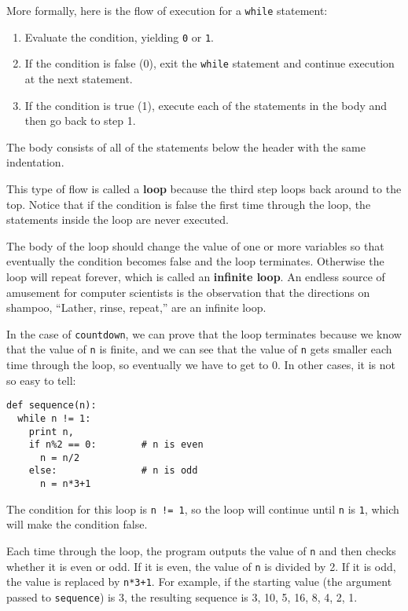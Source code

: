 More formally, here is the flow of execution for a {\tt while} statement:

\begin{enumerate}

\item Evaluate the condition, yielding {\tt 0} or {\tt 1}.

\item If the condition is false (0), exit the {\tt while} statement
and continue execution at the next statement.

\item If the condition is true (1), execute each of the statements in the
body and then go back to step 1.

\end{enumerate}

The body consists of all of the statements below the header
with the same indentation.

This type of flow is called a {\bf loop} because the third step
loops back around to the top.  Notice that if the condition is false
the first time through the loop, the statements inside the loop are
never executed.


The body of the loop should change the value of one or more variables
so that eventually the condition becomes false and the loop
terminates.  Otherwise the loop will repeat forever, which is called
an {\bf infinite loop}.  An endless source of amusement for computer
scientists is the observation that the directions on shampoo,
``Lather, rinse, repeat,'' are an infinite loop.

In the case of {\tt countdown}, we can prove that the loop
terminates because we know that the value of {\tt n} is finite, and we
can see that the value of {\tt n} gets smaller each time through the
loop, so eventually we have to get to 0.  In other
cases, it is not so easy to tell:

\beforeverb
\begin{verbatim}
def sequence(n):
  while n != 1:
    print n,
    if n%2 == 0:        # n is even
      n = n/2
    else:               # n is odd
      n = n*3+1
\end{verbatim}
\afterverb
%
The condition for this loop is {\tt n != 1}, so the loop will continue until
{\tt n} is {\tt 1}, which will make the condition false.

Each time through the loop, the program outputs the value of {\tt n}
and then checks whether it is even or odd.  If it is even, the value
of {\tt n} is divided by 2.  If it is odd, the value is replaced by
{\tt n*3+1}. For example, if the starting value (the argument passed
to {\tt sequence}) is 3, the resulting sequence is 3, 10, 5, 16, 8, 4, 2, 1.

